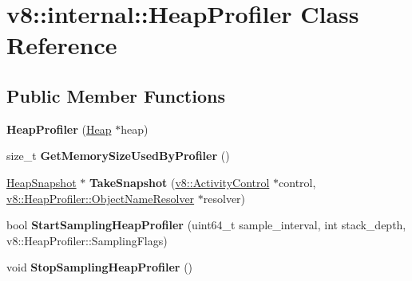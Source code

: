 \hypertarget{classv8_1_1internal_1_1_heap_profiler}{}\section{v8\+:\+:internal\+:\+:Heap\+Profiler Class Reference}
\label{classv8_1_1internal_1_1_heap_profiler}
\subsection*{Public Member Functions}
\begin{DoxyCompactItemize}
\item 
{\bfseries Heap\+Profiler} (\hyperlink{classv8_1_1internal_1_1_heap}{Heap} $\ast$heap)\hypertarget{classv8_1_1internal_1_1_heap_profiler_a9db62c5fefbbac5e205b512ae91ab7a5}{}\label{classv8_1_1internal_1_1_heap_profiler_a9db62c5fefbbac5e205b512ae91ab7a5}

\item 
size\+\_\+t {\bfseries Get\+Memory\+Size\+Used\+By\+Profiler} ()\hypertarget{classv8_1_1internal_1_1_heap_profiler_a48c63ad30599ec88e912f5404b3f467f}{}\label{classv8_1_1internal_1_1_heap_profiler_a48c63ad30599ec88e912f5404b3f467f}

\item 
\hyperlink{classv8_1_1internal_1_1_heap_snapshot}{Heap\+Snapshot} $\ast$ {\bfseries Take\+Snapshot} (\hyperlink{classv8_1_1_activity_control}{v8\+::\+Activity\+Control} $\ast$control, \hyperlink{classv8_1_1_heap_profiler_1_1_object_name_resolver}{v8\+::\+Heap\+Profiler\+::\+Object\+Name\+Resolver} $\ast$resolver)\hypertarget{classv8_1_1internal_1_1_heap_profiler_a73df699bfc0779341b604234eeb6d809}{}\label{classv8_1_1internal_1_1_heap_profiler_a73df699bfc0779341b604234eeb6d809}

\item 
bool {\bfseries Start\+Sampling\+Heap\+Profiler} (uint64\+\_\+t sample\+\_\+interval, int stack\+\_\+depth, v8\+::\+Heap\+Profiler\+::\+Sampling\+Flags)\hypertarget{classv8_1_1internal_1_1_heap_profiler_aa552bb2e9de9ebc13562a8e0ee7130f9}{}\label{classv8_1_1internal_1_1_heap_profiler_aa552bb2e9de9ebc13562a8e0ee7130f9}

\item 
void {\bfseries Stop\+Sampling\+Heap\+Profiler} ()\hypertarget{classv8_1_1internal_1_1_heap_profiler_a41401a85a0bebc56c4e9f7181de92e25}{}\label{classv8_1_1internal_1_1_heap_profiler_a41401a85a0bebc56c4e9f7181de92e25}


\end{DoxyCompactItemize}
